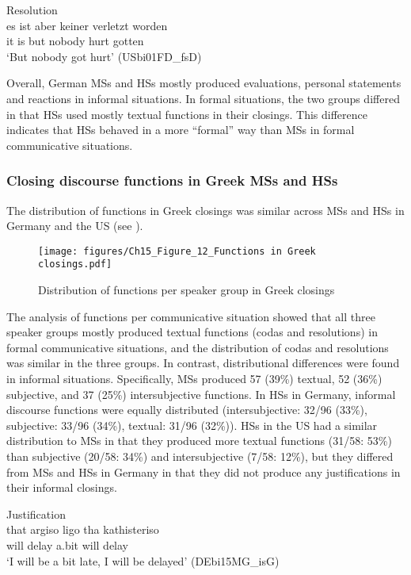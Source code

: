 \documentclass[output=paper,colorlinks,citecolor=brown]{langscibook}
\begin{document}
\ea Resolution\\ \label{katsikaetal:fiftyoneresolution}
\gll es ist aber keiner verletzt worden\\
     it is but nobody hurt gotten\\
\glt ‘But nobody got hurt’ (USbi01FD\_fsD)
\z

Overall, German MSs and HSs mostly produced evaluations, personal statements and reactions in informal situations. In formal situations, the two groups differed in that HSs used mostly textual functions in their closings. This difference indicates that HSs behaved in a more “formal” way than MSs in formal communicative situations. 

\subsubsection{Closing discourse functions in Greek MSs and HSs}
The distribution of functions in Greek closings was similar across MSs and HSs in Germany and the US (see ). 

\begin{figure}
    \centering
    \texttt{[image: figures/Ch15\_Figure\_12\_Functions in Greek closings.pdf]}
    \caption{Distribution of functions per speaker group in Greek closings}
    \label{fig:katsikaetal:Greekfunctionsclosings}
\end{figure}

The analysis of functions per communicative situation showed that all three speaker groups mostly produced textual functions (codas and resolutions) in formal communicative situations, and the distribution of codas and resolutions was similar in the three groups. In contrast, distributional differences were found in informal situations. Specifically, MSs produced 57 (39\%) textual, 52 (36\%)  subjective, and 37 (25\%)  intersubjective functions. In HSs in Germany, informal discourse functions were equally distributed (intersubjective: 32/96 (33\%), subjective: 33/96 (34\%), textual: 31/96 (32\%)). HSs in the US had a similar distribution to MSs in that they produced more textual functions (31/58: 53\%) than subjective (20/58: 34\%) and intersubjective (7/58: 12\%), but they differed from MSs and HSs in Germany in that they did not produce any justifications in their informal closings. 

\ea Justification\\ \label{katsikaetal:fiftytwojustification}
\gll that argiso ligo tha kathisteriso\\
     will delay a.bit will delay\\
\glt ‘I will be a bit late, I will be delayed’ (DEbi15MG\_isG)
\z
\end{document}
